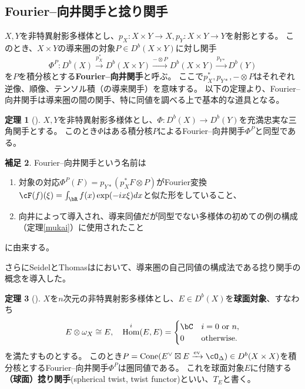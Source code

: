 \documentclass[uplatex,11pt,a4paper,dvipdfmx]{jsarticle}
\numberwithin{equation}{section}
\theoremstyle{definition}
\newtheorem{theorem}{定理}[section]
\newtheorem{remark}[theorem]{補足}
\DeclareMathOperator{\Hom}{\mathrm{Hom}}
\DeclareMathOperator{\Cone}{\mathrm{Cone}}
\DeclareMathOperator{\ev}{\mathrm{ev}}
\begin{document}
\subsection{Fourier--向井関手と捻り関手}
$X, Y$を非特異射影多様体とし、$p_X \colon X\times Y \to X, p_Y \colon X \times Y \to Y$を射影とする。
このとき、$X \times Y$の導来圏の対象$P \in D^b(X \times Y)$に対し関手
\begin{equation}
    \Phi^P \colon D^b(X) \xrightarrow{p_X^*} D^b(X \times Y) \xrightarrow{ - \otimes P} D^b(X \times Y) \xrightarrow{p_{Y*}} D^b(Y)
\end{equation}
を$P$を積分核とする\textbf{Fourier--向井関手}と呼ぶ。
ここで$p_X^*, p_{Y*}, - \otimes P$はそれぞれ逆像、順像、テンソル積（の導来関手）を意味する。
以下の定理より、Fourier--向井関手は導来圏の間の関手、特に同値を調べる上で基本的な道具となる。
\begin{theorem}[\cite{MR1465519}]
    $X, Y$を非特異射影多様体とし、$\Phi \colon D^b(X) \to D^b(Y)$を充満忠実な三角関手とする。
    このとき$\Phi$はある積分核$P$によるFourier--向井関手$\Phi^P$と同型である。
\end{theorem}
\begin{remark}
    Fourier--向井関手という名前は
    \begin{enumerate}
        \item 対象の対応$\Phi^P(F) = p_{Y*}(p_X^*F \otimes P)$がFourier変換$\cF(f)(\xi) = \int_\bR f(x)\exp(-ix\xi)dx$と似た形をしていること、
        \item 向井\cite{MR607081}によって導入され、導来同値だが同型でない多様体の初めての例の構成（定理\ref{mukai}）に使用されたこと
    \end{enumerate}
    に由来する。
\end{remark}
さらにSeidelとThomasは\cite{MR1831820}において、導来圏の自己同値の構成法である捻り関手の概念を導入した。
\begin{theorem}[\cite{MR1831820}]
    $X$を$n$次元の非特異射影多様体とし、$E \in D^b(X)$を\textbf{球面対象}、すなわち\begin{equation}
        E \otimes \omega_X \cong E,\quad \Hom^i(E, E) = \begin{cases}
            \bC & i = \text{$0$ or $n$}, \\
            0   & \text{otherwise.}
        \end{cases}
    \end{equation}を満たすものとする。
    このとき$P = \Cone(E^\vee \boxtimes E \xrightarrow{\ev} \cO_\Delta) \in D^b(X \times X)$を積分核とするFourier--向井関手$\Phi^P$は圏同値である。
    これを球面対象$E$に付随する\textbf{（球面）捻り関手}(spherical twist, twist functor)といい、$T_E$と書く。
\end{theorem}
\end{document}
